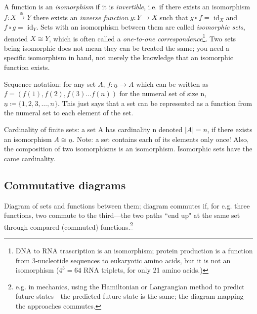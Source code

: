 \documentclass{article}
\begin{document}
A function is an \textit{isomorphism} if it is \textit{invertible}, i.e. if there exists an isomorphism $f: X \stackrel{\cong}{\longrightarrow} Y$ there exists an \emph{inverse function} $g: Y \rightarrow X$ such that $g \circ f = $ id$_{X}$ and $f \circ g = $ id$_{Y}$. Sets with an isomorphism between them are called \emph{isomorphic sets}, denoted $X \cong Y$, which is often called a \emph{one-to-one correspondence}\footnote{DNA to RNA trascription is an isomorphism; protein production is a function from 3-nucleotide sequences to eukaryotic amino acids, but it is not an isomorphism ($4^{3}=64$ RNA triplets, for only 21 amino acids.)}. Two sets being isomorphic does not mean they can be treated the same; you need a specific isomorphism in hand, not merely the knowledge that an isomorphic function exists.

Sequence notation: for any set $A$, $f: \underline{n} \rightarrow A$ which can be written as $f = (f(1),f(2),f(3) \ldots f(n))$ for the numeral set of size n, $\underline{n} \coloneqq \{ 1,2,3, \ldots ,n \}$. This just says that a set can be represented as a function from the numeral set to each element of the set.

Cardinality of finite sets: a set A has cardinality n denoted $\left\vert{A}\right\vert = n$, if there exists an isomorphism $A \cong \underline{n}$. Note: a set contains each of its elements only once! Also, the composition of two isomorphisms is an isomorphism. Isomorphic sets have the came cardinality.

\setcounter{subsection}{1}
\subsection{Commutative diagrams}
Diagram of sets and functions between them;  diagram commutes if, for e.g. three functions, two commute to the third---the two paths ``end up" at the same set through compared (commuted) functions.\footnote{e.g. in mechanics, using the Hamiltonian or Langrangian method to predict future states---the predicted future state is the same; the diagram mapping the approaches commutes.}
\end{document}
